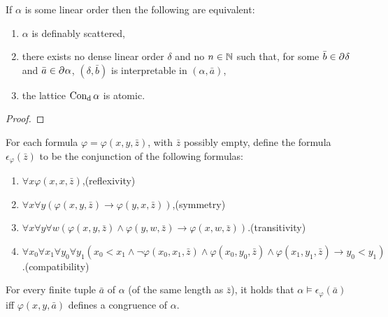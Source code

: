 \begin{prp}
        If $\alpha$ is some linear order then the following are equivalent:
        \begin{enumerate}
            \item   $\alpha$ is definably scattered,
	    \item   there exists no dense linear order $\delta$ and no $n\in\nats$ such that, for some $\bar{b}\in\domain{n}\delta$ and $\bar{a}\in\domain{n}\alpha$, $(\delta,\bar{b})$ is interpretable in $(\alpha,\bar{a})$,
            \item   the lattice $\defcon\alpha$ is atomic.
        \end{enumerate}
\end{prp}
    	\begin{proof}

	\end{proof}

\begin{prp}\label{prp:dcform}
	For each formula $\varphi=\varphi(x,y,\bar{z})$, with $\bar{z}$ possibly empty, define the formula $\epsilon_\varphi(\bar{z})$ to be the conjunction of the following formulas:
	\begin{enumerate}
		\item	$\forall x\varphi(x,x,\bar{z})$,\hfill(reflexivity)
		\item	$\forall x\forall y(\varphi(x,y,\bar{z})\rightarrow\varphi(y,x,\bar{z}))$,\hfill (symmetry)
		\item 	$\forall x\forall y\forall w(\varphi(x,y,\bar{z})\wedge\varphi(y,w,\bar{z})\rightarrow\varphi(x,w,\bar{z}))$.\hfill (transitivity)
		\item 	$\forall x_0\forall x_1\forall y_0\forall y_1(x_0<x_1\wedge\neg\varphi(x_0,x_1,\bar{z})\wedge\varphi(x_0,y_0,\bar{z})\wedge\varphi(x_1,y_1,\bar{z})\rightarrow y_0<y_1)$.\phantom{}\hfill(compatibility)
	\end{enumerate}
	For every finite tuple $\bar{a}$ of $\alpha$ (of the same length as $\bar{z}$), it holds that $\alpha\models\epsilon_\varphi(\bar{a})$ iff $\varphi(x,y,\bar{a})$ defines a congruence of $\alpha$.
\end{prp}

